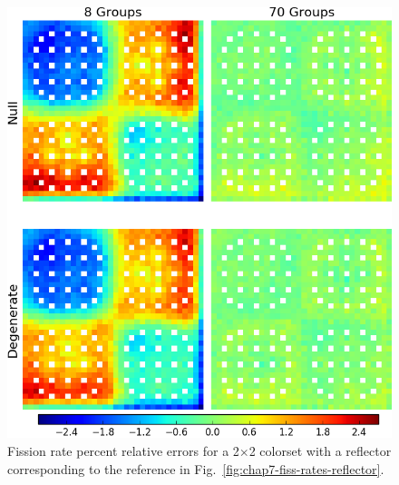 \begin{figure}[h!]
\centering
\includegraphics[width=\linewidth]{figures/quantification/reflector/fiss-err}
\vspace{2mm}
\caption[Fission rate errors for a 2$\times$2 colorset with a reflector]{Fission rate percent relative errors for a 2$\times$2 colorset with a reflector corresponding to the reference in Fig.~\ref{fig:chap7-fiss-rates-reflector}.}
\label{fig:chap8-reflector-fiss-err}
\end{figure}

\clearpage

